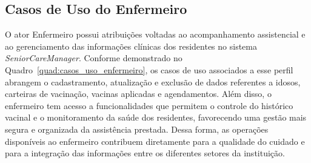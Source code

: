 \subsection{Casos de Uso do Enfermeiro}

O ator Enfermeiro possui atribuições voltadas ao acompanhamento assistencial e ao gerenciamento das informações clínicas dos residentes no sistema \textit{SeniorCareManager}. Conforme demonstrado no Quadro~\ref{quad:casos_uso_enfermeiro}, os casos de uso associados a esse perfil abrangem o cadastramento, atualização e exclusão de dados referentes a idosos, carteiras de vacinação, vacinas aplicadas e agendamentos. Além disso, o enfermeiro tem acesso a funcionalidades que permitem o controle do histórico vacinal e o monitoramento da saúde dos residentes, favorecendo uma gestão mais segura e organizada da assistência prestada. Dessa forma, as operações disponíveis ao enfermeiro contribuem diretamente para a qualidade do cuidado e para a integração das informações entre os diferentes setores da instituição.

